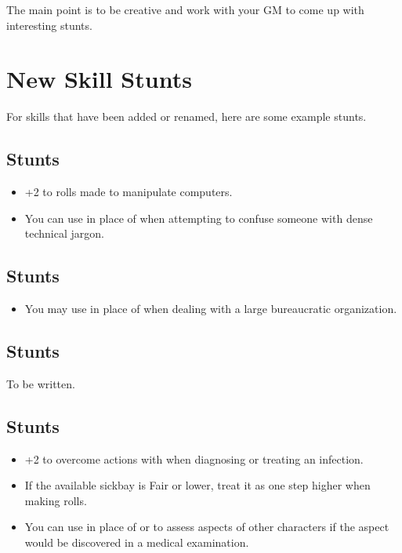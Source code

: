 \documentclass[12pt,titlepage,openany]{book}
\begin{document}
\noindent
The main point is to be creative and work with your GM to come up with
interesting stunts.

\section{New Skill Stunts}\label{sec:skill-stunts}

For skills that have been added or renamed, here are some example stunts.

\subsection*{ Stunts}\label{subsec:academics-stunts}

\begin{itemize}
    \item {} +2 to  rolls made to
        manipulate computers.
    \item {} You can use  in place of
         when attempting to confuse someone with dense technical
        jargon.
\end{itemize}

\subsection*{ Stunts}\label{subsec:bureaucracy-stunts}

\begin{itemize}
    \item {} You may use  in place of
         when dealing with a large bureaucratic organization.
\end{itemize}

\subsection*{ Stunts}\label{subsec:engineering-stunts}

To be written.

\subsection*{ Stunts}\label{subsec:medicine-stunts}

\begin{itemize}
    \item {} +2 to overcome actions with
         when diagnosing or treating an infection.

    \item {} If the available sickbay is Fair or lower, treat
        it as one step higher when making  rolls.

    \item {} You can use  in place of
         or  to assess aspects of other characters
        if the aspect would be discovered in a medical examination.
\end{itemize}
\end{document}
